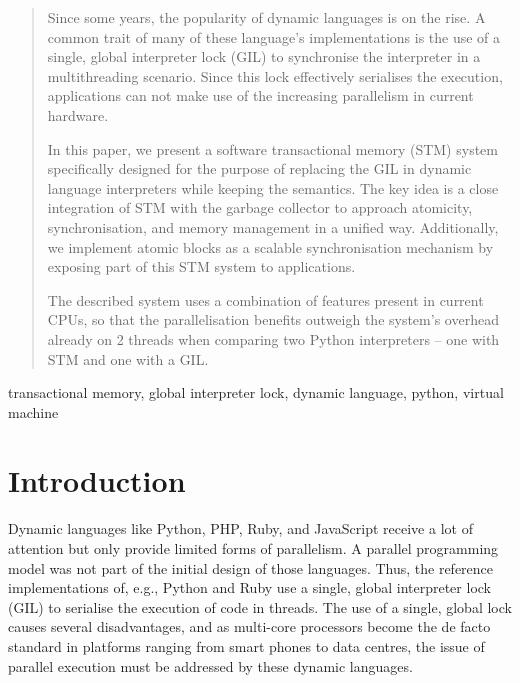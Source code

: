 \documentclass{sigplanconf}
\begin{document}
\begin{abstract}

Since some years, the popularity of dynamic languages is on the rise.
A common trait of many of these language's implementations is the use of
a single, global interpreter lock (GIL) to synchronise the interpreter
in a multithreading scenario. Since this lock effectively serialises
the execution, applications can not make use of the increasing parallelism in
current hardware.

In this paper, we present a software transactional memory (STM) system
specifically designed for the purpose of replacing the GIL in dynamic
language interpreters while keeping the semantics. The key idea is a
close integration of STM with the garbage collector to approach
atomicity, synchronisation, and memory management in a unified
way. Additionally, we implement atomic blocks as a scalable
synchronisation mechanism by exposing part of this STM system to
applications.

The described system uses a combination of features present in current
CPUs, so that the parallelisation benefits outweigh the system's
overhead already on 2 threads when comparing two Python interpreters
-- one with STM and one with a GIL.


\end{abstract}



\keywords
transactional memory, global interpreter lock, dynamic language,
python, virtual machine


\section{Introduction}

Dynamic languages like Python, PHP, Ruby, and JavaScript receive a lot
of attention but only provide limited forms of parallelism. A parallel
programming model was not part of the initial design of those languages. Thus,
the reference implementations of, e.g., Python and Ruby use a single,
global interpreter lock (GIL) to serialise the execution of code in
threads. The use of a single, global lock causes several disadvantages,
and as multi-core processors become the de facto standard in platforms
ranging from smart phones to data centres, the issue of parallel
execution must be addressed by these dynamic languages.
\end{document}
